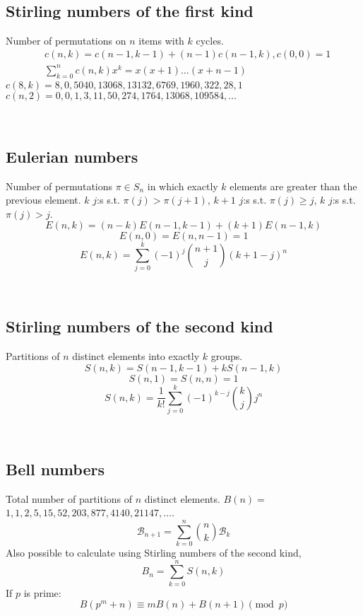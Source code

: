\


	\subsection{Stirling numbers of the first kind}
		Number of permutations on $n$ items with $k$ cycles.
		\begin{align*}
			&c(n,k) = c(n-1,k-1) + (n-1) c(n-1,k), c(0,0) = 1\\
			&\textstyle \sum_{k=0}^n c(n,k)x^k = x(x+1) \dots (x+n-1)
		\end{align*}
		$c(8,k) = 8, 0, 5040, 13068, 13132, 6769, 1960, 322, 28, 1$ 
		$c(n,2) = 0, 0, 1, 3, 11, 50, 274, 1764, 13068, 109584, \dots$

\

	\subsection{Eulerian numbers}
		Number of permutations $\pi \in S_n$ in which exactly $k$ elements are greater than the previous element. $k$ $j$:s s.t. $\pi(j)>\pi(j+1)$, $k+1$ $j$:s s.t. $\pi(j)\geq j$, $k$ $j$:s s.t. $\pi(j)>j$.
		$$E(n,k) = (n-k)E(n-1,k-1) + (k+1)E(n-1,k)$$
		$$E(n,0) = E(n,n-1) = 1$$
		$$E(n,k) = \sum_{j=0}^k(-1)^j\binom{n+1}{j}(k+1-j)^n$$

\


	\subsection{Stirling numbers of the second kind}
		Partitions of $n$ distinct elements into exactly $k$ groups.
		$$S(n,k) = S(n-1,k-1) + k S(n-1,k)$$
		$$S(n,1) = S(n,n) = 1$$
		$$S(n,k) = \frac{1}{k!}\sum_{j=0}^k (-1)^{k-j}\binom{k}{j}j^n$$

\

	\subsection{Bell numbers}
		Total number of partitions of $n$ distinct elements. $B(n) =$
		$1, 1, 2, 5, 15, 52, 203, 877, 4140, 21147, \dots$. 
		\begin{equation*}
        \mathcal{B}_{n+1} = \sum_{k=0}^n \binom{n}{k} \mathcal{B}_k
      \end{equation*}
      Also possible to calculate using Stirling numbers of the second kind,
      \[B_n = \sum_{k = 0}^{n} S(n, k)\]
      If $p$ is prime:
		\[ B(p^m+n)\equiv mB(n)+B(n+1) \pmod{p} \]

